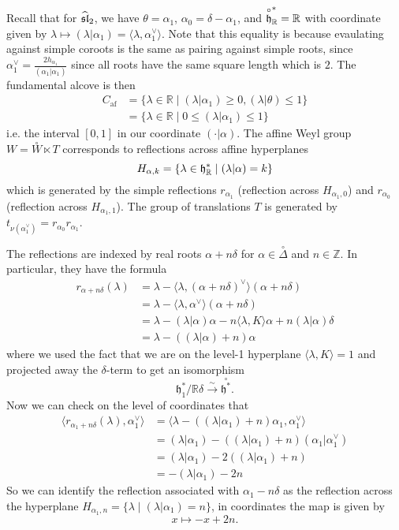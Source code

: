 \documentclass[12pt]{article}
\begin{document}
\begin{example}
    [Affine $\sl_2$] Recall that for $\widehat{\sl}_2$, we have $\theta = \alpha_1$, $\alpha_0 = \delta - \alpha_1$, and $\overset{\circ}{\mf h}^*_\mathbb{R} = \mathbb{R}$ with coordinate given by $\lambda \mapsto (\lambda|\alpha_1) = \langle \lambda, \alpha_1^\vee \rangle$. Note that this equality is because evaulating against simple coroots is the same as pairing against simple roots, since $\alpha_1^\vee = \frac{2 h_{\alpha_1}}{(\alpha_1|\alpha_1)}$ since all roots have the same square length which is $2$.
    The fundamental alcove is then \begin{align*}
    C_{\mathrm{af}} &= \{\lambda \in \mathbb{R} \mid (\lambda|\alpha_1) \geq 0, (\lambda|\theta) \leq 1\} \\
    &= \{\lambda \in \mathbb{R} \mid 0 \leq (\lambda|\alpha_1) \leq 1\}
    \end{align*} i.e. the interval $[0,1]$ in our coordinate $(\cdot | \alpha)$. The affine Weyl group $W = \overset{\circ}{W} \ltimes T$ corresponds to reflections across affine hyperplanes \[H_{\alpha,k} = \{\lambda \in \mf h^*_\mathbb{R} \mid (\lambda|\alpha) = k\}\] which is generated by the simple reflections $r_{\alpha_1}$ (reflection across $H_{\alpha_1,0}$) and $r_{\alpha_0}$ (reflection across $H_{\alpha_1,1}$). The group of translations $T$ is generated by $t_{\nu(\alpha_1^\vee)} = r_{\alpha_0} r_{\alpha_1}$.

The reflections are indexed by real roots $\alpha + n\delta$ for $\alpha \in \overset{\circ}{\Delta}$ and $n \in \mathbb{Z}$. In particular, they have the formula \begin{align*}
    r_{\alpha + n\delta}(\lambda) &= \lambda - \langle \lambda, (\alpha + n\delta)^\vee \rangle (\alpha + n\delta) \\
    &= \lambda - \langle \lambda, \alpha^\vee \rangle (\alpha + n\delta) \\
    &= \lambda - (\lambda|\alpha)\alpha - n\langle \lambda, K\rangle \alpha + n(\lambda|\alpha)\delta \\
    &= \lambda - ((\lambda|\alpha) + n)\alpha
\end{align*} where we used the fact that we are on the level-1 hyperplane $\langle \lambda, K \rangle = 1$ and projected away the $\delta$-term to get an isomorphism \[\mathfrak{h}^*_1/\mathbb{R}\delta \xrightarrow{\sim} \overset{\circ}{\mathfrak{h}^*}.\] Now we can check on the level of coordinates that \begin{align*}
    \langle r_{\alpha_1 + n\delta}(\lambda), \alpha_1^\vee \rangle &= \langle \lambda - ((\lambda|\alpha_1) + n)\alpha_1, \alpha_1^\vee \rangle \\
    &= (\lambda|\alpha_1) - ((\lambda|\alpha_1) + n)(\alpha_1|\alpha_1^\vee) \\
    &= (\lambda|\alpha_1) - 2((\lambda|\alpha_1) + n) \\
    &= -(\lambda|\alpha_1) - 2n
\end{align*}
So we can identify the reflection associated with $\alpha_1 - n\delta$ as the reflection across the hyperplane $H_{\alpha_1,n} = \{\lambda \mid (\lambda|\alpha_1) = n\}$, in coordinates the map is given by \[x \mapsto -x + 2n.\] 


\end{example}
\end{document}
